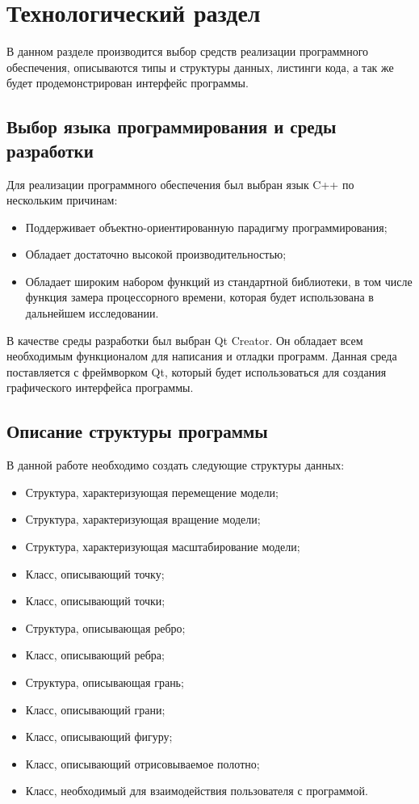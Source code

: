 \chapter{Технологический раздел}
В данном разделе производится выбор средств реализации программного обеспечения, описываются типы и структуры данных, листинги кода, а так же будет продемонстрирован интерфейс программы.

\section{Выбор языка программирования и среды разработки}

Для реализации программного обеспечения был выбран язык C++ по нескольким причинам:
\begin{itemize}
	\item Поддерживает объектно-ориентированную парадигму программирования;
	\item Обладает достаточно высокой производительностью;
	\item Обладает широким набором функций из стандартной библиотеки, в том числе функция замера процессорного времени, которая будет использована в дальнейшем исследовании.
\end{itemize}

В качестве среды разработки был выбран Qt Creator. Он обладает всем необходимым функционалом для написания и отладки программ. Данная среда поставляется с фреймворком Qt, который будет использоваться для создания графического интерфейса программы.


\section{Описание структуры программы}
В данной работе необходимо создать следующие структуры данных:

\begin{itemize}
	\item Структура, характеризующая перемещение модели;
	\item Структура, характеризующая вращение модели;
	\item Структура, характеризующая масштабирование модели;
	\item Класс, описывающий точку;
	\item Класс, описывающий точки;
	\item Структура, описывающая ребро;
	\item Класс, описывающий ребра;
	\item Структура, описывающая грань;
	\item Класс, описывающий грани;
	\item Класс, описывающий фигуру;
	\item Класс, описывающий отрисовываемое полотно;
	\item Класс, необходимый для взаимодействия пользователя с программой.
\end{itemize}


